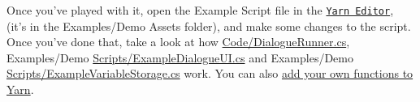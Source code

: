 Once you've played with it, open the Example Script file in the \href{http://github.com/infiniteammoinc/Yarn}{\tt Yarn Editor}, (it's in the {\ttfamily Examples/\-Demo Assets} folder), and make some changes to the script. Once you've done that, take a look at how {\ttfamily \hyperlink{a00277}{Code/\-Dialogue\-Runner.\-cs}}, {\ttfamily Examples/\-Demo \hyperlink{a00281}{Scripts/\-Example\-Dialogue\-U\-I.\-cs}} and {\ttfamily Examples/\-Demo \hyperlink{a00282}{Scripts/\-Example\-Variable\-Storage.\-cs}} work. You can also \hyperlink{a00204}{add your own functions to Yarn}. 